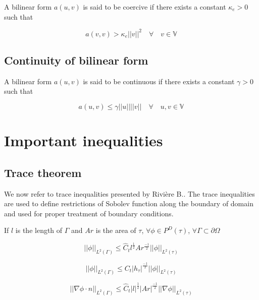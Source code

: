 \documentclass[a4paper]{book}
\begin{document}
A bilinear form $a(u,v)$ is said to be coercive if there exists a constant $\kappa_e > 0$ such that

\begin{equation}\label{Coercivity}
a(v,v) > \kappa_e ||v||^2   \quad \forall \quad v \in  \mathbb{V}
\end{equation}

\subsection{Continuity of bilinear form}

A bilinear form $a(u,v)$ is said to be continuous if there exists a constant $\gamma > 0$ such that

\begin{equation}\label{Continuity_constant}
a(u,v) \leq \gamma ||u||||v|| \quad  \forall \quad u,v \in  \mathbb{V}
\end{equation}

\section{Important inequalities}

\subsection{Trace theorem} 

We now refer to trace inequalities presented by Rivi\`ere B.\cite{riviere}. The trace inequalities are used to define restrictions of Sobolev function along the boundary of domain and used for proper treatment of boundary conditions. 

If $l$ is the length of $\Gamma$ and $Ar$ is the area of $\tau$,  $\forall \phi \in P^D (\tau)$, $\forall \Gamma \subset \partial \Omega$

\begin{equation}
||\phi||_{L^2(\Gamma)} \leq \hat{C}_t l^{\frac{1}{2}} Ar^{\frac{-1}{2}} ||\phi||_{L^2(\tau)}
\end{equation}

\begin{equation}
||\phi||_{L^2(\Gamma)} \leq {C}_t |h_\tau|^{\frac{-1}{2}} ||\phi||_{L^2(\tau)}
\end{equation}

\begin{equation}
||\nabla \phi \cdot n||_{L^2(\Gamma)} \leq \hat{C}_t |l|^{\frac{1}{2}} |Ar|^{\frac{-1}{2}} ||\nabla \phi||_{L^2(\tau)}
\end{equation}
\end{document}
